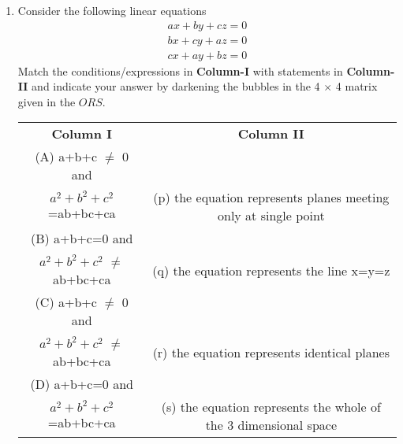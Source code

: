 \begin{enumerate}[label=\arabic*.,ref=\thesubsection.\theenumi]
\item Consider the following linear equations
\begin{align*}
ax+by+cz=0
\end{align*}
\begin{align*}
bx+cy+az=0
\end{align*}
\begin{align*}
cx+ay+bz=0
\end{align*}
Match the conditions/expressions in \textbf{Column-I} with statements in \textbf{Column-II} and indicate your answer by darkening the bubbles in the 4 $\times$ 4 matrix given in the $ORS$.
\begin{table}[ht!]
\centering
\begin{tabular}{c c} 
 \textbf{Column I} & \textbf{Column II}\\ [0.5ex] 
 (A) a+b+c $\neq$ 0 and\\
     $a^2+b^2+c^2$=ab+bc+ca                             &(p) the equation represents planes meeting 
                                                             only at single point\\ 
 (B) a+b+c=0 and\\
  $a^2+b^2+c^2$ $\neq$ ab+bc+ca                         &(q) the equation represents the line x=y=z\\
 (C) a+b+c $\neq$ 0 and\\
  $a^2+b^2+c^2$ $\neq$ ab+bc+ca                         &(r) the equation represents identical planes\\
 (D) a+b+c=0 and\\
  $a^2+b^2+c^2$=ab+bc+ca                                &(s) the equation represents the whole of the 
                                                             3 dimensional space\\[1ex] 
\end{tabular}
\end{table}


\end{enumerate}
